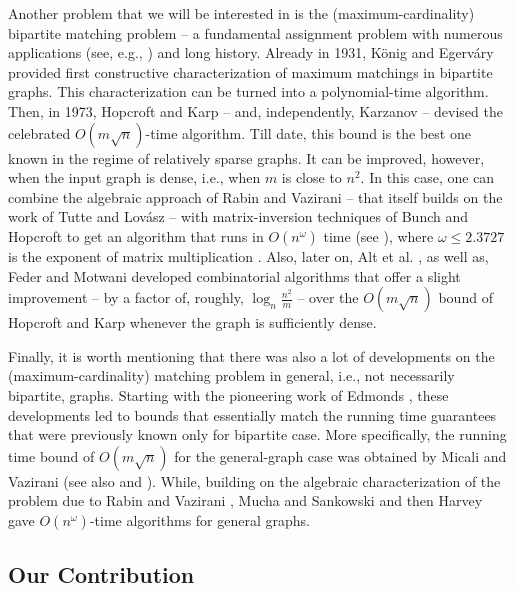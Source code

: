 \documentclass[11pt, letterpaper]{article}
\begin{document}
  Another problem that we will be interested in is the (maximum-cardinality) bipartite matching problem -- a fundamental assignment problem with numerous applications (see, e.g., \cite{AhujaMO93,LovaszP86}) and long history. Already in 1931, K\"onig \cite{Konig31} and Egerv\'ary \cite{Egervary31} provided first constructive characterization of maximum matchings in bipartite graphs. This characterization can be turned into a polynomial-time algorithm. Then, in 1973, Hopcroft and Karp \cite{HopcroftK73} -- and, independently, Karzanov \cite{Karzanov73} -- devised the celebrated $O(m\sqrt{n})$-time algorithm. Till date, this bound is the best one known in the regime of relatively sparse graphs. It can be improved, however, when the input graph is dense, i.e., when $m$ is close to $n^2$. In this case, one can combine the algebraic approach of Rabin and Vazirani \cite{RabinV89} -- that itself builds on the work of Tutte \cite{Tutte47} and Lov\'asz \cite{Lovasz79} -- with matrix-inversion techniques of Bunch and Hopcroft \cite{BunchH74} to get an algorithm that runs in $O(n^{\omega})$ time (see \cite{Mucha05}), where $\omega\leq 2.3727$ is the exponent of matrix multiplication \cite{CoppersmithW90, Vassilevska12}. Also, later on, Alt et al. \cite{AltBMP91}, as well as, Feder and Motwani \cite{FederM95} developed combinatorial algorithms that offer a slight improvement -- by a factor of, roughly, $\log_n \frac{n^2}{m}$ -- over the $O(m\sqrt{n})$ bound of Hopcroft and Karp whenever the graph is sufficiently dense. 
  
  Finally, it is worth mentioning that there was also a lot of developments on the (maximum-cardinality) matching problem in general, i.e., not necessarily bipartite, graphs. Starting with the pioneering work of Edmonds \cite{Edmonds65}, these developments led to bounds that essentially match the running time guarantees that were previously known only for bipartite case. More specifically, the running time bound of $O(m\sqrt{n})$ for the general-graph case was obtained by Micali and Vazirani \cite{MicaliV80,Vazirani94} (see also \cite{GabowT91} and \cite{GoldbergK04}). While, building on the algebraic characterization of the problem due to Rabin and Vazirani \cite{RabinV89}, Mucha and Sankowski \cite{MuchaS04} and then Harvey \cite{Harvey09} gave $O(n^{\omega})$-time algorithms for general graphs.
  
\subsection{Our Contribution}
\end{document}
